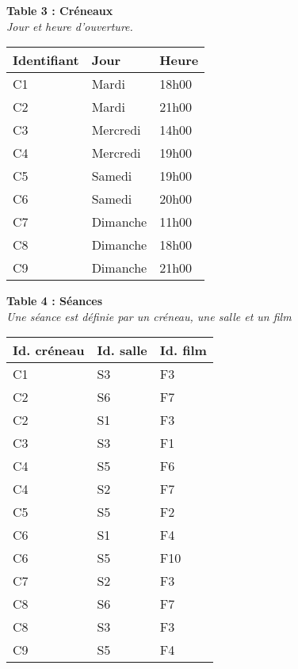 \documentclass[class=report,crop=false, 12pt]{standalone}
\begin{document}
%
{\footnotesize
\begin{minipage}{0.4\textwidth}

\textbf{Table 3 : Créneaux}\\
\emph{Jour et heure d'ouverture.} \\

\begin{tabular}{|l|l|l|} \hline
\textbf{Identifiant} & \textbf{Jour} & \textbf{Heure} \\ \hline\hline
C1 & Mardi & 18h00 \\ \hline
C2 & Mardi & 21h00 \\ \hline
C3 & Mercredi & 14h00 \\ \hline
C4 & Mercredi & 19h00 \\ \hline
C5 & Samedi & 19h00 \\ \hline
C6 & Samedi & 20h00 \\ \hline
C7 & Dimanche & 11h00 \\ \hline
C8 & Dimanche & 18h00 \\ \hline
C9 & Dimanche & 21h00 \\ \hline
\end{tabular}
\end{minipage}
%
%
\begin{minipage}{0.4\textwidth}

\textbf{Table 4 : Séances}\\
\emph{Une séance est définie par un créneau, une salle et un film} \\

\begin{tabular}{|l|l|l|} \hline
\textbf{Id. créneau} & \textbf{Id. salle} & \textbf{Id. film} \\ \hline\hline
C1 & S3 & F3 \\ \hline
C2 & S6 & F7 \\ \hline
C2 & S1 & F3 \\ \hline
C3 & S3 & F1 \\ \hline
C4 & S5 & F6 \\ \hline
C4 & S2 & F7 \\ \hline
C5 & S5 & F2 \\ \hline
C6 & S1 & F4 \\ \hline
C6 & S5 & F10 \\ \hline
C7 & S2 & F3 \\ \hline
C8 & S6 & F7 \\ \hline
C8 & S3 & F3 \\ \hline
C9 & S5 & F4 \\ \hline
\end{tabular}
\end{minipage}
}
\end{document}
